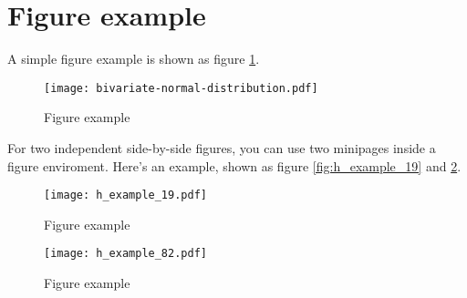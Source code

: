\section{Figure example}\label{sec:figure}

A simple figure example is shown as figure \ref{fig:bivariate}.

\begin{figure}[!htb]
\centering
\texttt{[image: bivariate-normal-distribution.pdf]}
\caption{Figure example}\label{fig:bivariate}
\end{figure}

For two independent side-by-side figures, you can use two minipages inside a figure enviroment. Here's an example, shown as figure \ref{fig:h_example_19} and \ref{fig:h_example_82}.
\begin{figure}[!htb]
\begin{minipage}[t]{0.5\linewidth}
\centering
\texttt{[image: h\_example\_19.pdf]}
\caption{Figure example}\label{fig:h_example_19}
\end{minipage}
\begin{minipage}[t]{0.5\linewidth}
\centering
\texttt{[image: h\_example\_82.pdf]}
\caption{Figure example}\label{fig:h_example_82}
\end{minipage}
\end{figure}

